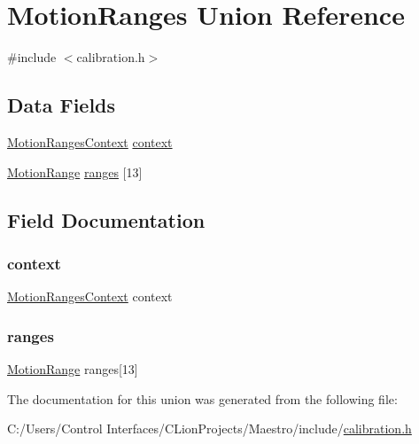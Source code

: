 \hypertarget{union_motion_ranges}{}\section{Motion\+Ranges Union Reference}
\label{union_motion_ranges}


{\ttfamily \#include $<$calibration.\+h$>$}

\subsection*{Data Fields}
\begin{DoxyCompactItemize}
\item 
\hyperlink{struct_motion_ranges_context}{Motion\+Ranges\+Context} \hyperlink{union_motion_ranges_ae7bfbfe79fd117bed1932c806a9c07ee}{context}
\item 
\hyperlink{struct_motion_range}{Motion\+Range} \hyperlink{union_motion_ranges_aca4fa9b9e3130a7583ed6fd79a107463}{ranges} \mbox{[}13\mbox{]}
\end{DoxyCompactItemize}


\subsection{Field Documentation}
\mbox{\label{union_motion_ranges_ae7bfbfe79fd117bed1932c806a9c07ee}} 
\subsubsection{\texorpdfstring{context}{context}}
{\footnotesize\ttfamily \hyperlink{struct_motion_ranges_context}{Motion\+Ranges\+Context} context}

\mbox{\label{union_motion_ranges_aca4fa9b9e3130a7583ed6fd79a107463}} 
\subsubsection{\texorpdfstring{ranges}{ranges}}
{\footnotesize\ttfamily \hyperlink{struct_motion_range}{Motion\+Range} ranges\mbox{[}13\mbox{]}}



The documentation for this union was generated from the following file\+:\begin{DoxyCompactItemize}
\item 
C\+:/\+Users/\+Control Interfaces/\+C\+Lion\+Projects/\+Maestro/include/\hyperlink{calibration_8h}{calibration.\+h}\end{DoxyCompactItemize}
